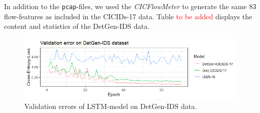\documentclass[runningheads]{llncs}
\begin{document}
In addition to the \texttt{pcap}-files, we used the \textit{CICFlowMeter} to generate the same 83 flow-features as included in the CICIDs-17 data. Table \textcolor{red}{to be added} displays the content and statistics of the DetGen-IDS data.
%
%
%
%
%
%
%



\begin{figure}
\centering
\includegraphics[width=0.99\textwidth]{images/ValLoss.png}
\caption{Validation errors of LSTM-model \cite{henryLSTM} on DetGen-IDS data.}\label{Fig:ValLoss}
\end{figure}
\end{document}
